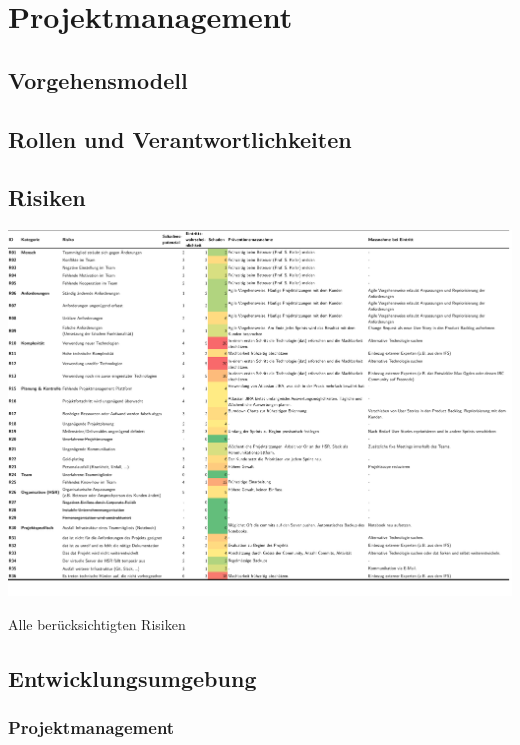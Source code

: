 \part{Projektmanagement}

\chapter{Vorgehensmodell}


\chapter{Rollen und Verantwortlichkeiten}


\chapter{Risiken}\label{sec:risiken}


\newpage
\begin{landscape}
	\begin{table}
		\centering
		\includegraphics[width=\linewidth,height=\textheight,keepaspectratio]{risikoanalyse.pdf}
		\caption{Alle berücksichtigten Risiken}
		\label{tab:risikoanalyse}
	\end{table}
\end{landscape}
\newpage

\chapter{Entwicklungsumgebung}


\section{Projektmanagement}
